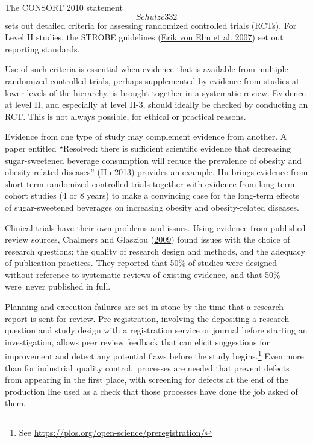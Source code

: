 \documentclass[
  10pt,
  b5paper]{book}
\begin{document}
The CONSORT 2010 statement \[Schulzc332\] sets out detailed criteria for
assessing randomized controlled trials (RCTs). For Level II studies, the
STROBE guidelines (\protect\hyperlink{ref-erik2007strengthening}{Erik von Elm et al. 2007}) set out reporting standards.

Use of such criteria is essential when evidence that is available from
multiple randomized controlled trials, perhaps supplemented by evidence
from studies at lower levels of the hierarchy, is brought together in a
systematic review. Evidence at level II, and especially at level II-3,
should ideally be checked by conducting an RCT. This is not always
possible, for ethical or practical reasons.

Evidence from one type of study may complement evidence from another. A
paper entitled ``Resolved: there is sufficient scientific evidence that
decreasing sugar-sweetened beverage consumption will reduce the
prevalence of obesity and obesity-related diseases'' (\protect\hyperlink{ref-hu2013resolved}{Hu 2013})
provides an example. Hu brings evidence from short-term randomized
controlled trials together with evidence from long term cohort studies
(4 or 8 years) to make a convincing case for the long-term effects of
sugar-sweetened beverages on increasing obesity and obesity-related
diseases.

Clinical trials have their own problems and issues. Using evidence from
published review sources, Chalmers and Glasziou (\protect\hyperlink{ref-chalmers2009avoidable}{2009}) found issues with the
choice of research questions; the quality of research design and
methods, and the adequacy of publication practices. They reported that
50\% of studies were designed without reference to systematic reviews of
existing evidence, and that 50\% were~never published in full.

Planning and execution failures are set in stone by the time that a
research report is sent for review. Pre-registration, involving the
depositing a research question and study design with a registration
service or journal before starting an investigation, allows peer review
feedback that can elicit suggestions for improvement and detect any
potential flaws before the study begins.\footnote{See \url{https://plos.org/open-science/preregistration/}} Even more than
for industrial~quality control,~processes are needed that prevent
defects from appearing in the first place, with screening for defects at
the end of the production line used as a check that those processes have
done the job asked of them.
\end{document}
